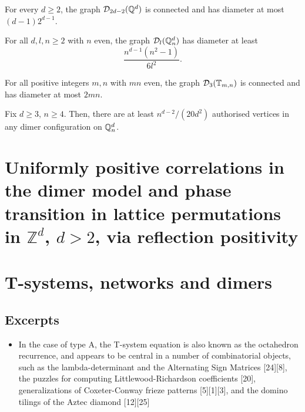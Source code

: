 \begin{theorem}[Ergodicity on $\bQ^d$]\label{thm-dynamics-6}
	For every $d \geq 2$, the graph $\mathcal{D}_{2d - 2}(\mathbb{Q}^d)$ is connected and has diameter at most $(d - 1) 2^{d - 1}$.
\end{theorem}

\begin{theorem}\label{thm-dynamics-7}
	For all $d, l, n \geq 2$ with $n$ even, the graph $\mathcal{D}_{l}(\mathbb{Q}^d_n)$ has diameter at least $$\frac{n^{d - 1} (n^2 - 1)}{6l^2}.$$
\end{theorem}

\begin{theorem}[Ergodicity on $\bT_{m,n}$]\label{thm-dynamics-8}
	For all positive integers $m, n$ with $mn$ even, the graph $\mathcal{D}_{3}(\mathbb{T}_{m,n})$ is connected and has diameter at most $2mn$.
\end{theorem}

\begin{lemma}\label{lemma-dynamics-10}
	Fix $d \geq 3$, $n \geq 4$. Then, there are at least $n^{d-2}/(20d^2)$ authorised vertices in any dimer configuration on $\mathbb{Q}_n^d$. 
\end{lemma}

\section{Uniformly positive correlations in the dimer model and	phase transition in lattice permutations in $\mathbb{Z}^d$, $d > 2$, via reflection positivity \cite{taggi2019uniformly}}

\section{T-systems, networks and dimers \cite{di2014tystemsnetworksdimers}	}
\subsection{Excerpts}
\begin{itemize}
	\item  In the case of type A, the T-system equation is also known as the octahedron recurrence, and appears to be central in a number of combinatorial objects, such as the lambda-determinant and the Alternating Sign Matrices [24][8], the puzzles for computing Littlewood-Richardson coefficients [20], generalizations of Coxeter-Conway frieze patterns [5][1][3], and the domino tilings of the Aztec diamond [12][25]
\end{itemize}

